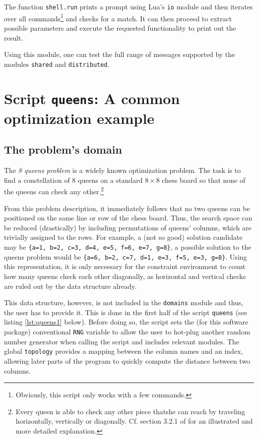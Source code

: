 \begin{appendices}
The function \texttt{shell.run} prints a prompt using Lua's \texttt{io} module and then iterates over all commands\footnote{Obviously, this script only works with a few commands.} and checks for a match. It can then proceed to extract possible parameters and execute the requested functionality to print out the result.

Using this module, one can test the full range of messages supported by the modules \texttt{shared} and \texttt{distributed}.

\chapter{Script \texttt{queens}: A common optimization example}
\label{chap:app:queens}

\section{The problem's domain}
\label{sec:app:queens:domain}

The \emph{8 queens problem} is a widely known optimization problem. The task is to find a constellation of 8 queens on a standard $8 \times 8$ chess board so that none of the queens can check any other.\footnote{Every queen is able to check any other piece thatshe can reach by traveling horizontally, vertically or diagonally. Cf. section 3.2.1 of \cite{RussellNorvig2003} for an illustrated and more detailed explanation.}

From this problem description, it immediately follows that no two queens can be positioned on the same line or row of the chess board. Thus, the search space can be reduced (drastically) by including permutations of queens' columns, which are trivially assigned to the rows. For example, a (not so good) solution candidate may be \texttt{\{a=1, b=2, c=3, d=4, e=5, f=6, e=7, g=8\}}, a possible solution to the queens problem would be \texttt{\{a=6, b=2, c=7, d=1, e=3, f=5, e=3, g=8\}}. Using this representation, it is only necessary for the constraint environment to count how many queens check each other diagonally, as horizontal and vertical checks are ruled out by the data structure already.

This data structure, however, is not included in the \texttt{domains} module and thus, the user has to provide it. This is done in the first half of the script \texttt{queens} (see listing \ref{lst:queens1} below). Before doing so, the script sets the (for this software package) conventional \texttt{RNG} variable to allow the user to hot-plug another random number generator when calling the script and includes relevant modules. The global \texttt{topology} provides a mapping between the column names and an index, allowing later parts of the program to quickly compute the distance between two columns.


\end{appendices}

